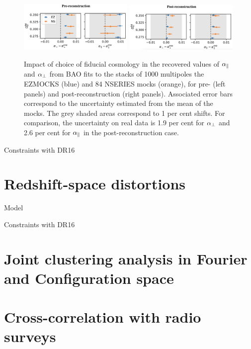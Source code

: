 \begin{figure}
    \centering 
    \includegraphics[width=0.49\textwidth]{fig/galaxies/bao_bias_prerecon.png}
    \includegraphics[width=0.49\textwidth]{fig/galaxies/bao_bias_postrecon.png}
    \caption{Impact of choice of fiducial cosmology in the recovered values
    of ${\alpha_\parallel}$ and ${\alpha_\perp}$ from BAO fits to the stacks of 1000 multipoles the \textsc{EZMOCKS} 
    (blue) and 84 \textsc{NSERIES} mocks (orange), for pre- (left panels) and post-reconstruction
    (right panels). Associated error bars correspond to the uncertainty estimated from 
    the mean of the mocks. The grey shaded areas correspond to 1 per cent shifts. 
    For comparison, the uncertainty on real data is 1.9 per cent for ${\alpha_\perp}$ 
    and 2.6 per cent for ${\alpha_\parallel}$ in the post-reconstruction case.
    }
    \label{fig:bao_bias_mocks}
\end{figure}

Constraints with DR16 

\section{Redshift-space distortions}
\label{galaxies:rsd}

Model 

Constraints with DR16 

\section{Joint clustering analysis in Fourier and Configuration space}
\label{galaxies:joint}




\section{Cross-correlation with radio surveys}
\label{galaxies:radio}

\cite{wolzHIConstraintsCrosscorrelation2021}